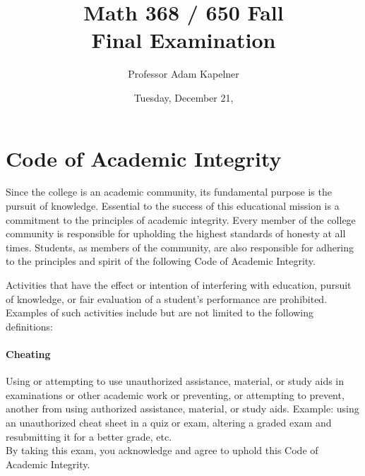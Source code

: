 \documentclass[12pt,landscape]{article}
\title{Math 368 / 650 Fall \the\year{} \\ Final Examination}
\author{Professor Adam Kapelner}
\date{Tuesday, December 21, \the\year{}}
\begin{document}
\maketitle


\thispagestyle{empty}

\section*{Code of Academic Integrity}

\footnotesize
Since the college is an academic community, its fundamental purpose is the pursuit of knowledge. Essential to the success of this educational mission is a commitment to the principles of academic integrity. Every member of the college community is responsible for upholding the highest standards of honesty at all times. Students, as members of the community, are also responsible for adhering to the principles and spirit of the following Code of Academic Integrity.

Activities that have the effect or intention of interfering with education, pursuit of knowledge, or fair evaluation of a student's performance are prohibited. Examples of such activities include but are not limited to the following definitions:

\paragraph{Cheating} Using or attempting to use unauthorized assistance, material, or study aids in examinations or other academic work or preventing, or attempting to prevent, another from using authorized assistance, material, or study aids. Example: using an unauthorized cheat sheet in a quiz or exam, altering a graded exam and resubmitting it for a better grade, etc.
\\

\noindent By taking this exam, you acknowledge and agree to uphold this Code of Academic Integrity. \\


\normalsize
\vspace{-.5cm}
\end{document}
